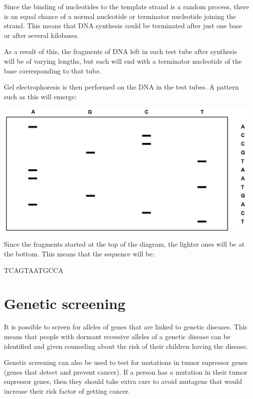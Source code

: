 \documentclass{article}
\begin{document}
Since the binding of nucleotides to the template strand is a random process,
there is an equal chance of a normal nucleotide or terminator nucleotide joining
the strand. This means that DNA synthesis could be terminated after just one
base or after several kilobases.

As a result of this, the fragments of DNA left in each test tube after synthesis
will be of varying lengths, but each will end with a terminator nucleotide of
the base corresponding to that tube.

Gel electrophoresis is then performed on the DNA in the test tubes. A pattern
such as this will emerge:

\begin{center}
	\includegraphics[scale=0.3]{sanger_method}
\end{center}

Since the fragments started at the top of the diagram, the lighter ones will be
at the bottom. This means that the sequence will be:

\begin{center}
	TCAGTAATGCCA
\end{center}

\section*{Genetic screening}

It is possible to screen for alleles of genes that are linked to genetic
diseases. This means that people with dormant recessive alleles of a genetic
disease can be identified and given counseling about the risk of their children
having the disease.

Genetic screening can also be used to test for mutations in tumor supressor
genes (genes that detect and prevent cancer). If a person has a mutation in
their tumor supressor genes, then they should take extra care to avoid mutagens
that would increase their risk factor of getting cancer.
\end{document}
